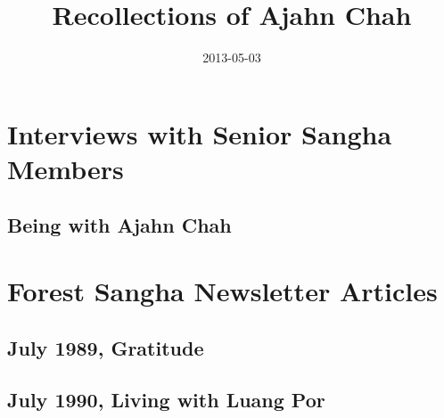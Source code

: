 \documentclass[
  pagePreset=smallpage,
  babelLanguage=british,
]{aruno-anecdote}
\title{Recollections of Ajahn Chah}
\subtitle{}
\author{}
\date{2013-05-03}
\begin{document}

\frontmatter


\cleartorecto
\thispagestyle{empty}



\cleartoverso
\thispagestyle{empty}



\cleartorecto
\thispagestyle{empty}



\tableofcontents


\mainmatter

\part{Interviews with Senior Sangha Members}

\chapter{Being with Ajahn Chah}


\part{Forest Sangha Newsletter Articles}

\chapter[July 1989, Gratitude to Ajahn Chah]{July 1989, Gratitude\newline {}}


\chapter{July 1990, Living with Luang Por}

\end{document}
